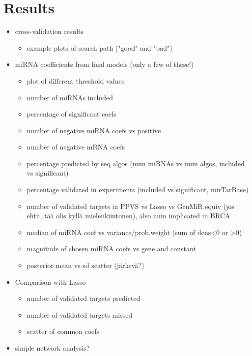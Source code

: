 
\section{Results}

\begin{itemize}
  \item cross-validation results
  \begin{itemize}
    \item example plots of search path ("good" and "bad")
  \end{itemize}
  \item miRNA coefficients from final models (only a few of these!)
  \begin{itemize}
  	\item plot of different threshold values
    \item number of miRNAs included
    \item percentage of significant coefs
    \item number of negative miRNA coefs vs positive
    \item number of negative mRNA coefs
    \item percentage predicted by seq algos (num miRNAs vs num algos, included vs significant)
    \item percentage validated in experiments (included vs significant, mirTarBase)
    \item number of validated targets in PPVS vs Lasso vs GenMiR equiv (jos ehtii, tää olis kyllä mielenkiintonen), also num implicated in BRCA
    \item median of miRNA coef vs variance/prob.weight (sum of dens<0 or >0)
    \item magnitude of chosen miRNA coefs vs gene and constant
    \item posterior mean vs sd scatter (järkevä?)
  \end{itemize}
  \item Comparison with Lasso
  \begin{itemize}
    \item number of validated targets predicted
    \item number of validated targets missed
    \item scatter of common coefs
  \end{itemize}
  \item simple network analysis?
\end{itemize}

